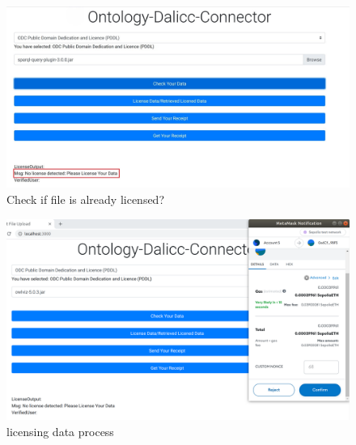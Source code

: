 \begin{center}
	\begin{figure}[htb!]
		
		\begin{minipage}{0.55\linewidth}
			\centering
			\includegraphics[width=1.95\textwidth]{images/chap03_checkFile.jpg}
		\end{minipage}
		\caption[Check if file is already licensed?]{Check if file is already licensed?}
		
	\end{figure}
	
\end{center}
\begin{center}
	\begin{figure}[htb!]
		
		\begin{minipage}{0.55\linewidth}
			\centering
			\includegraphics[width=1.95\textwidth]{images/chap03_license_data.png}
		\end{minipage}
		\caption[licensing data process]{licensing data process}
		
	\end{figure}
	
\end{center}
